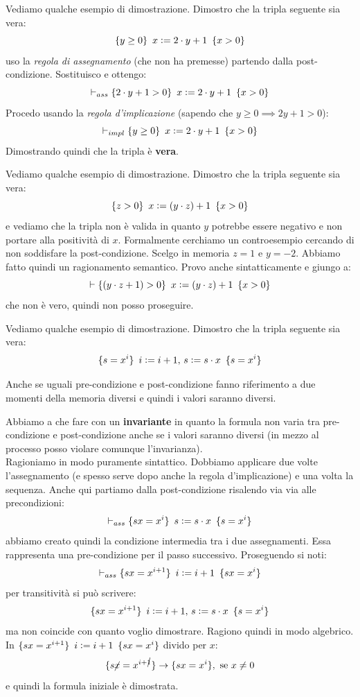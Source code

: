 \begin{esempio}
	Vediamo qualche esempio di dimostrazione. Dimostro che la tripla seguente sia
	vera:
	\[\{y\geq 0\}\,\,\, x\cceq 2\cdot y+1\,\,\,\{x>0\}\]
	uso la \emph{regola di assegnamento} (che non ha premesse) partendo dalla
	post-condizione. Sostituisco e ottengo:
	\[\vdash_{ass}\{2\cdot y+1> 0\}\,\,\, x\cceq 2\cdot y+1\,\,\,\{x>0\}\]
	Procedo usando la \emph{regola d'implicazione} (sapendo che $y\geq 0\implies
	2y+1>0$):
	\[\vdash_{impl}\{y\geq 0\}\,\,\, x\cceq 2\cdot y+1\,\,\,\{x>0\}\]
	Dimostrando quindi che la tripla è \textbf{vera}.
\end{esempio}
\begin{esempio}
	Vediamo qualche esempio di dimostrazione. Dimostro che la tripla seguente sia
	vera:
	\[\{z> 0\}\,\,\, x\cceq (y\cdot z)+1\,\,\,\{x>0\}\]
	e vediamo che la tripla non è valida in quanto $y$ potrebbe essere negativo e
	non portare alla positività di $x$. Formalmente cerchiamo un controesempio
	cercando di non soddisfare la post-condizione. Scelgo in memoria $z=1$ e
	$y=-2$. Abbiamo fatto quindi un ragionamento semantico. Provo anche
	sintatticamente e giungo a:
	\[\vdash\{(y\cdot z+1)> 0\}\,\,\, x\cceq (y\cdot z)+1\,\,\,\{x>0\}\]
	che non è vero, quindi non posso proseguire.
\end{esempio}
\begin{esempio}
	Vediamo qualche esempio di dimostrazione. Dimostro che la tripla seguente sia
	vera:
	\[\{s=x^i\}\,\,\, i\cceq i+1,\, s\cceq s\cdot x\,\,\,\{s=x^i\}\]
	\begin{nota}
	Anche se uguali pre-condizione e post-condizione fanno riferimento a due momenti
		della memoria diversi e quindi i valori saranno diversi.
	\end{nota}
	Abbiamo a che fare con un \textbf{invariante} in quanto la formula non varia
	tra pre-condizione e post-condizione anche se i valori saranno diversi (in mezzo
	al processo posso violare comunque l'invarianza).\\
	Ragioniamo in modo puramente sintattico. Dobbiamo applicare due volte
	l'assegnamento (e spesso serve dopo anche la regola d'implicazione) e una
	volta la sequenza. Anche qui partiamo dalla post-condizione risalendo via via
	alle precondizioni:
	\[\vdash_{ass}\{sx=x^i\}\,\,\, s\cceq s\cdot x\,\,\,\{s=x^i\}\]
	abbiamo creato quindi la condizione intermedia tra i due assegnamenti. Essa rappresenta una pre-condizione per il passo successivo. Proseguendo si noti:
	\[\vdash_{ass}\{sx=x^{i+1}\}\,\,\, i\cceq i+1\,\,\,\{sx=x^i\}\]
	per transitività si può scrivere:
	\[\{sx=x^{i+1}\}\,\,\, i\cceq i+1,\, s\cceq s\cdot x\,\,\,\{s=x^i\}\]
	ma non coincide con quanto voglio dimostrare. Ragiono quindi in modo
	algebrico. In $\{sx=x^{i+1}\}\,\,\, i\cceq i+1\,\,\,\{sx=x^i\}$ divido per $x$:
	\[\{s\cancel{x}=x^{i+\cancel{1}}\}\to\{sx=x^i\},\mbox{ se }x\neq 0\]
	e quindi la formula iniziale è dimostrata.
\end{esempio}
